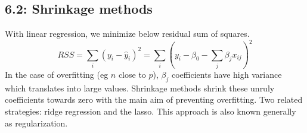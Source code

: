 \documentclass{article}
\begin{document}
\subsection*{6.2: Shrinkage methods}

With linear regression, we minimize below residual sum of squares.
\[
RSS = \sum_i \left( y_i - \hat{y}_i \right)^2
= \sum_i \left( y_i - \beta_0 - \sum_j \beta_j x_{ij} \right)^2
\]
In the case of overfitting (eg $n$ close to $p$), $\beta_j$ coefficients have high variance which translates into large values. Shrinkage methods shrink these unruly coefficients towards zero with the main aim of preventing overfitting. Two related strategies: ridge regression and the lasso. This approach is also known generally as regularization.
\end{document}
